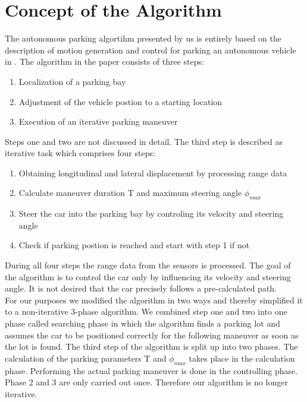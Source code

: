 \documentclass[paper=a4, fontsize=11pt]{scrreprt}
\begin{document}
\section{Concept of the Algorithm}
The autonomous parking algortihm presented by us is entirely based on the description of motion generation and control for parking an autonomous vehicle in \cite{mgcpav}. The algorithm in the paper consists of three steps: 
\begin{enumerate}
	\item Localization of a parking bay
	\item Adjustment of the vehicle postion to a starting location
	\item Execution of an iterative parking maneuver
\end{enumerate}
Steps one and two are not discussed in detail. The third step is described as iterative task which comprises four steps:
\begin{enumerate}
	\item Obtaining longitudinal and lateral displacement by processing range data
	\item Calculate maneuver duration T and maximum steering angle $\phi_{max}$
	\item Steer the car into the parking bay by controling its velocity and steering angle
	\item Check if parking postion is reached and start with step 1 if not
\end{enumerate}
During all four steps the range data from the sensors is processed. The goal of the algorithm is to control the car only by influencing its velocity and steering angle. It is not desired that the car precisely follows a pre-calculated path.\\
For our purposes we modified the algorithm in two ways and thereby simplified it to a non-iterative 3-phase algorithm. We combined step one and two into one phase called searching phase in which the algorithm finds a parking lot and assumes the car to be positioned correctly for the following maneuver as soon as the lot is found. The third step of the algorithm is split up into two phases. The calculation of the parking parameters T and $\phi_{max}$ takes place in the calculation phase. Performing the actual parking maneuver is done in the controlling phase. Phase 2 and 3 are only carried out once. Therefore our algorithm is no longer iterative.
\end{document}
